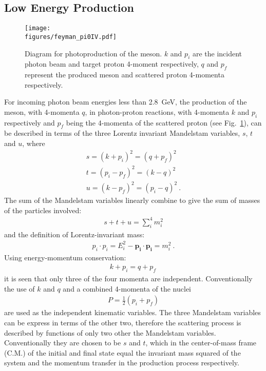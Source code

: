 \subsection{Low Energy \piz Production}\label{sec:into:xsection.low}

\begin{figure}[h!]\begin{center}
\texttt{[image: \\figures/feyman\_pi0IV.pdf]}
\caption[Diagram for \piz Photoproduction]{\label{fig:xsection.pi0feynman}	Diagram for photoproduction of the \piz meson. $k$ and $p_i$ are the incident photon beam and target proton 4-moment respectively, $q$ and $p_f$ represent the produced \piz meson and scattered proton 4-momenta respectively.}
\end{center}\end{figure}
For incoming photon beam energies less than 2.8~GeV, the production of the \piz meson, with 4-momenta $q$, in photon-proton reactions, with 4-momenta $k$ and $p_i$ respectively and $p_f$ being the 4-momenta of the scattered proton (see Fig.~\ref{fig:xsection.pi0feynman}),  can be described in terms of the three Lorentz invariant Mandelstam variables, $s$, $t$ and $u$, where
\begin{align}
s = (k+p_i)^2 = (q+p_f)^2 \nonumber \\
t=(p_i-p_f)^2 = (k-q)^2  \nonumber \\
u = (k - p_f)^2 = (p_i-q)^2 \ .
\end{align}
The sum of the Mandelstam variables linearly combine to give the sum of masses of the particles involved:
\begin{align}
s + t + u = \sum\limits_{i}^{4} m_i^2 
\end{align}
and the definition of Lorentz-invariant mass:
\begin{align}
p_i\cdot p_i = E_i^2 - \mathbf{p_i}\cdot \mathbf{p_i} = m_i^2 \ .
\end{align}
Using energy-momentum conservation:
\begin{align}
k + p_i = q+p_f \,
\end{align}
it is seen that only three of the four momenta are independent. Conventionally the use of $k$ and $q$ and a combined 4-momenta of the nuclei 
\begin{align}
P = \frac{1}{2}(p_i+p_f)
\end{align}
are used as the independent kinematic variables. The three Mandelstam variables can be express in terms of the other two, therefore the scattering process is described by functions of only two other the Mandelstam variables. Conventionally they are chosen to be $s$ and $t$, which in the center-of-mass frame (C.M.) of the initial and final state equal the invariant mass squared of the system and the momentum transfer in the production process respectively.
